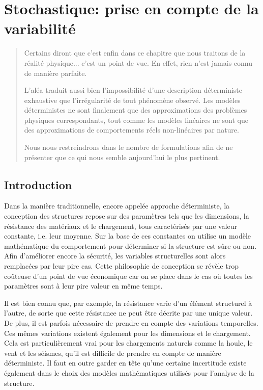\chapter{Stochastique: prise en compte de la variabilité}\label{Ch-stocha}
\begin{abstract}
Certains diront que c'est enfin dans ce chapitre que nous traitons de la réalité physique... c'est un point de vue.
En effet, rien n'est jamais connu de manière parfaite.

L'aléa traduit aussi bien l'impossibilité d'une description déterministe exhaustive que l'irrégularité de tout phénomène observé.
Les modèles déterministes ne sont finalement que des approximations des problèmes physiques correspondants, tout comme les modèles linéaires ne sont que des approximations de comportements réels non-linéaires par nature.

Nous nous restreindrons dans le nombre de formulations afin de ne présenter que ce qui nous semble aujourd'hui le plus pertinent.
\end{abstract}

\section{Introduction}

Dans la manière traditionnelle, encore appelée approche déterministe, la conception des structures repose sur des paramètres tels que les dimensions, la résistance des matériaux et le chargement, tous caractérisés par une valeur constante, i.e. leur moyenne. Sur la base de ces constantes on utilise un modèle mathématique du comportement pour déterminer si la structure est sûre ou non. Afin d'améliorer encore la sécurité, les variables structurelles sont alors remplacées par leur pire cas. Cette philosophie de conception se révèle trop coûteuse d'un point de vue économique car on se place dans le cas où toutes les paramètres sont à leur pire valeur en même temps.

Il est bien connu que, par exemple, la résistance varie d'un élément structurel à l'autre, de sorte que cette résistance ne peut être décrite par une unique valeur. De plus, il est parfois nécessaire de prendre en compte des variations temporelles. Ces mêmes variations existent également pour les dimensions et le chargement. Cela est particulièrement vrai pour les chargements naturels comme la houle, le vent et les séismes, qu'il est difficile de prendre en compte de manière déterministe. Il faut en outre garder en tête qu'une certaine incertitude existe également dans le choix des modèles mathématiques utilisés pour l'analyse de la structure.

